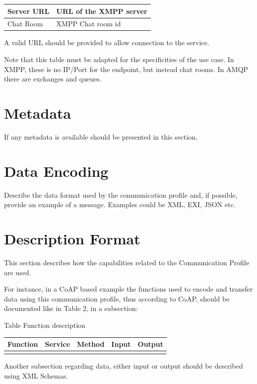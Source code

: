 \documentclass{article}
\newcounter{Table}
\renewcommand\theTable{\arabic{Table}}
\begin{document}
\begin{flushleft}
\tablefirsthead{}
\tablehead{}
\tabletail{}
\tablelasttail{}
\begin{supertabular}{|m{1.3566599in}|m{4.57616in}|}
\hline
{ Server URL} &
{ URL of the XMPP server}\\\hline
{ Chat Room} &
{ XMPP Chat room id}\\\hline
\end{supertabular}
\end{flushleft}
A valid URL should be provided to allow connection to the service.

Note that this table must be adapted for the specificities of the use case. In XMPP, these is no IP/Port for the endpoint, but instead chat rooms. In AMQP there are exchanges and queues.

\section[Metadata]{Metadata}
If any metadata is available should be presented in this section.

\section[Data Encoding ]{Data Encoding }
Describe the data format used by the communication profile and, if possible, provide an example of a message. Examples could be XML, EXI, JSON etc.

\section[Description Format]{Description Format}
This section describes how the capabilities related to the Communication Profile are used.

For instance, in a CoAP based example the functions used to encode and transfer data using this communication profile, thus according to CoAP, should be documented like in Table 2, in a subsection:

Table \stepcounter{Table}{\theTable} Function description

\begin{flushleft}
\tablefirsthead{}
\tablehead{}
\tabletail{}
\tablelasttail{}
\begin{supertabular}{|m{1.1448599in}|m{1.1393598in}|m{1.1413599in}|m{1.1316599in}|m{1.1400598in}|}
\hline
{ Function} &
{ Service} &
{ Method} &
{ Input} &
{ Output}\\\hline
 &
 &
 &
 &
\\\hline
\end{supertabular}
\end{flushleft}
Another subsection regarding data, either input or output should be described using XML Schemas.
\end{document}
